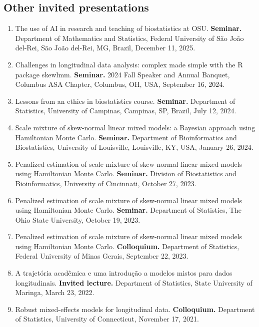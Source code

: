 \documentclass[
  10pt,
  letterpaper,
]{article}
\providecommand{\tightlist}{%
  \setlength{\itemsep}{0pt}\setlength{\parskip}{0pt}}
\begin{document}
\subsection{Other invited
presentations}\label{other-invited-presentations}

\begin{enumerate}
\def\labelenumi{\arabic{enumi}.}
\tightlist
\item
  The use of AI in research and teaching of biostatistics at OSU.
  \textbf{Seminar.} Department of Mathematics and Statistics, Federal
  University of São João del-Rei, São João del-Rei, MG, Brazil, December
  11, 2025.
\item
  Challenges in longitudinal data analysis: complex made simple with the
  R package skewlmm. \textbf{Seminar.} 2024 Fall Speaker and Annual
  Banquet, Columbus ASA Chapter, Columbus, OH, USA, September 16, 2024.
\item
  Lessons from an ethics in biostatistics course. \textbf{Seminar.}
  Department of Statistics, University of Campinas, Campinas, SP,
  Brazil, July 12, 2024.
\item
  Scale mixture of skew-normal linear mixed models: a Bayesian approach
  using Hamiltonian Monte Carlo. \textbf{Seminar.} Department of
  Bioinformatics and Biostatistics, University of Louisville,
  Louisville, KY, USA, January 26, 2024.
\item
  Penalized estimation of scale mixture of skew-normal linear mixed
  models using Hamiltonian Monte Carlo. \textbf{Seminar.} Division of
  Biostatistics and Bioinformatics, University of Cincinnati, October
  27, 2023.
\item
  Penalized estimation of scale mixture of skew-normal linear mixed
  models using Hamiltonian Monte Carlo. \textbf{Seminar.} Department of
  Statistics, The Ohio State University, October 19, 2023.
\item
  Penalized estimation of scale mixture of skew-normal linear mixed
  models using Hamiltonian Monte Carlo. \textbf{Colloquium.} Department
  of Statistics, Federal University of Minas Gerais, September 22, 2023.
\item
  A trajetória acadêmica e uma introdução a modelos mistos para dados
  longitudinais. \textbf{Invited lecture.} Department of Statistics,
  State University of Maringa, March 23, 2022.
\item
  Robust mixed-effects models for longitudinal data.
  \textbf{Colloquium.} Department of Statistics, University of
  Connecticut, November 17, 2021.
\end{enumerate}
\end{document}
